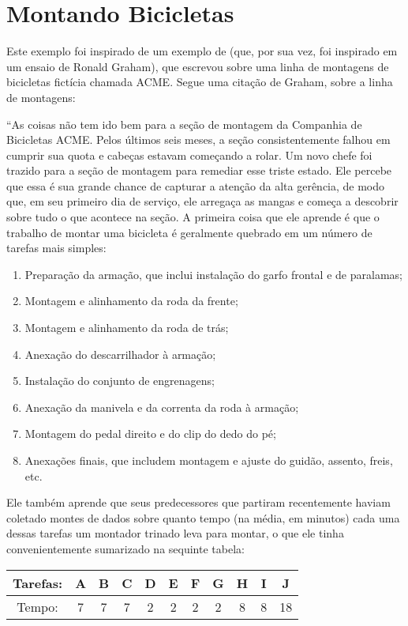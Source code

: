 \documentclass{article}
\begin{document}
\section{Montando Bicicletas}

Este exemplo foi inspirado de um exemplo de \cite{antonii} (que, por sua vez, foi inspirado em um
ensaio de Ronald Graham), que escrevou sobre uma linha de montagens de bicicletas fictícia chamada
ACME. Segue uma citação de Graham, sobre a linha de montagens:

``As coisas não tem ido bem para a seção de montagem da Companhia de Bicicletas ACME. Pelos últimos
seis meses, a seção consistentemente falhou em cumprir sua quota e cabeças estavam começando a
rolar. Um novo chefe foi trazido para a seção de montagem para remediar esse triste estado. Ele
percebe que essa é sua grande chance de capturar a atenção da alta gerência, de modo que, em seu
primeiro dia de serviço, ele arregaça as mangas e começa a descobrir sobre tudo o que acontece na seção.
A primeira coisa que ele aprende é que o trabalho de montar uma bicicleta é geralmente quebrado em
um número de tarefas mais simples:

\begin{enumerate}
  \item Preparação da armação, que inclui instalação do garfo frontal e de paralamas;
  \item Montagem e alinhamento da roda da frente;
  \item Montagem e alinhamento da roda de trás;
  \item Anexação do descarrilhador à armação;
  \item Instalação do conjunto de engrenagens;
  \item Anexação da manivela e da correnta da roda à armação;
  \item Montagem do pedal direito e do clip do dedo do pé;
  \item Anexações finais, que includem montagem e ajuste do guidão, assento, freis, etc.
\end{enumerate}

Ele também aprende que seus predecessores que partiram recentemente haviam coletado montes de dados
sobre quanto tempo (na média, em minutos) cada uma dessas tarefas um montador trinado leva para
montar, o que ele tinha convenientemente sumarizado na sequinte tabela:

\begin{tabular}{c c c c c c c c c c c}
Tarefas: & A & B & C & D & E & F & G & H & I & J \\
\hline
Tempo:   & 7 & 7 & 7 & 2 & 2 & 2 & 2 & 8 & 8 & 18  \\
\end{tabular}
\end{document}
